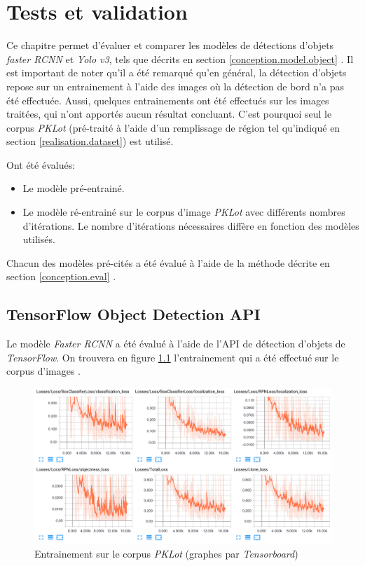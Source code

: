 \chapter{Tests et validation}\label{tests}
Ce chapitre permet d'évaluer et comparer les modèles de détections d'objets \textit{faster RCNN} et \textit{Yolo v3}, tels que décrits en section \ref{conception.model.object} . Il est important de noter qu'il a été remarqué qu'en général, la détection d'objets repose sur un entrainement à l'aide des images où la détection de bord n'a pas été effectuée. Aussi, quelques entrainements ont été effectués sur les images traitées, qui n'ont apportés aucun résultat concluant. C'est pourquoi seul le corpus \textit{PKLot} (pré-traité à l'aide d'un remplissage de région tel qu'indiqué en section \ref{realisation.dataset}) est utilisé.

Ont été évalués:
\begin{itemize}
    \item Le modèle pré-entrainé.
    \item Le modèle ré-entrainé sur le corpus d'image \textit{PKLot} avec différents nombres d'itérations. Le nombre d'itérations nécessaires diffère en fonction des modèles utilisés.
\end{itemize}

Chacun des modèles pré-cités a été évalué à l'aide de la méthode décrite en section \ref{conception.eval} . 

\section{TensorFlow Object Detection API}
Le modèle \textit{Faster RCNN} a été évalué à l'aide de l'API de détection d'objets de \textit{TensorFlow}. On trouvera en figure \ref{fig:tensorflow_train} l'entrainement qui a été effectué sur le corpus d'images .

\begin{figure}[H]
    \includegraphics[width=15cm]{img/tests/tensorflow_pklot_full_train.png}
    \centering
    \caption{Entrainement sur le corpus \textit{PKLot} (graphes par \textit{Tensorboard})}
    \label{fig:tensorflow_train}
\end{figure} 

